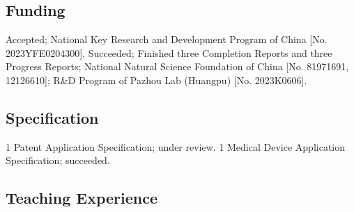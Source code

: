 \documentclass[10pt,a4paper,final]{moderncv}
\begin{document}
	\subsection{\textbf{Funding}}
		{Accepted; National Key Research and Development Program of China [No. 2023YFE0204300].}
		{Succeeded; Finished three Completion Reports and three Progress Reports; 
		National Natural Science Foundation of China [No. 81971691, 12126610]; 
		R\&D Program of Pazhou Lab (Huangpu) [No. 2023K0606].}
	\subsection{\textbf{Specification}}
		{1 Patent Application Specification; under review.}
		{1 Medical Device Application Specification; succeeded.}
	\subsection{\textbf{Teaching Experience}}
\end{document}
